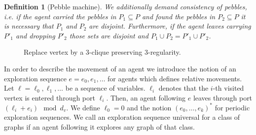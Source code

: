 \documentclass[oneside]{scrartcl}
\newtheorem{definition}{Definition}
\begin{document}
\begin{definition}[Pebble machine]
  We additionally demand consistency of pebbles, i.e. if the agent
  carried the pebbles in $P_{1}\subseteq P$ and found the pebbles in
  $P_{2}\subseteq P$ it is necessary that $P_{1}$ and $P_{2}$ are disjoint.
  Furthermore, if the agent leaves carrying $P'_{1}$ and dropping $P'_{2}$
  those sets are disjoint and $P_{1}\cup P_{2} = P'_{1}\cup P'_{2}$.
\end{definition}

\begin{wrapfigure}{r}{0.4\textwidth}
  \begin{center}
    \resizebox{0.3\textwidth}{!}{}
  \end{center}
  \caption{Replace vertex by a 3-clique preserving 3-regularity.}
  \label{fig:blowup}
\end{wrapfigure}
In order to describe the movement of an agent we introduce the notion of an
exploration sequence $e = e_{0}, e_{1},\dots$ for agents which defines relative
movements.
Let $\ell = \ell_{0},\ell_{1},\dots$ be a sequence of variables.
$\ell_{i}$ denotes that the $i$-th visited vertex is entered through port
$\ell_{i}$. Then, an agent following $e$ leaves through port
$(\ell_{i} + e_{i}) \mod d_{v}$. We define $\ell_{0} = 0$ and the notion
$(e_{0},\dots,e_{k})^{\ast}$ for periodic exploration sequences. We call an
exploration sequence universal for a class of graphs if an agent following
it explores any graph of that class.
\end{document}
